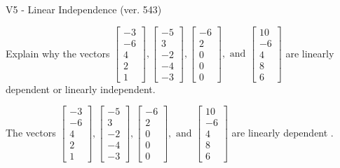 \begin{exercise}
  \begin{exerciseTitle}V5 - Linear Independence (ver. 543)\end{exerciseTitle}
  \begin{exerciseStatement}
    Explain why the vectors \(\left[\begin{array}{r}
-3 \\
-6 \\
4 \\
2 \\
1
\end{array}\right] , \left[\begin{array}{r}
-5 \\
3 \\
-2 \\
-4 \\
-3
\end{array}\right] , \left[\begin{array}{r}
-6 \\
2 \\
0 \\
0 \\
0
\end{array}\right] , \text{ and } \left[\begin{array}{r}
10 \\
-6 \\
4 \\
8 \\
6
\end{array}\right]\) are linearly dependent or linearly independent.	


  \end{exerciseStatement}
  \begin{exerciseAnswer}
   The vectors \(\left[\begin{array}{r}
-3 \\
-6 \\
4 \\
2 \\
1
\end{array}\right] , \left[\begin{array}{r}
-5 \\
3 \\
-2 \\
-4 \\
-3
\end{array}\right] , \left[\begin{array}{r}
-6 \\
2 \\
0 \\
0 \\
0
\end{array}\right] , \text{ and } \left[\begin{array}{r}
10 \\
-6 \\
4 \\
8 \\
6
\end{array}\right]\) are 
  	 linearly dependent  .
  


  \end{exerciseAnswer}
\end{exercise}